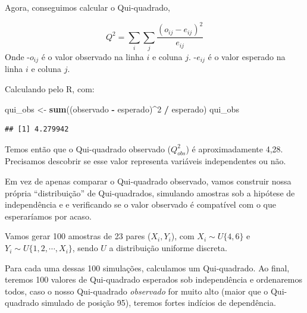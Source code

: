 \documentclass[
]{book}
\newenvironment{Shaded}{\begin{snugshade}}{\end{snugshade}}
\newcommand{\DecValTok}[1]{\textcolor[rgb]{0.00,0.00,0.81}{#1}}
\newcommand{\FunctionTok}[1]{\textcolor[rgb]{0.13,0.29,0.53}{\textbf{#1}}}
\newcommand{\NormalTok}[1]{#1}
\newcommand{\OtherTok}[1]{\textcolor[rgb]{0.56,0.35,0.01}{#1}}
\newcommand{\SpecialCharTok}[1]{\textcolor[rgb]{0.81,0.36,0.00}{\textbf{#1}}}
\begin{document}
Agora, conseguimos calcular o Qui-quadrado,

\[
Q^2 = \sum_i \sum_j \frac{(o_{ij}-e_{ij})^2}{e_{ij}}
\]
Onde
-\(o_{ij}\) é o valor observado na linha \(i\) e coluna \(j\).
-\(e_{ij}\) é o valor esperado na linha \(i\) e coluna \(j\).

Calculando pelo R, com:

\begin{Shaded}
\begin{Highlighting}[]
\NormalTok{qui\_obs }\OtherTok{\textless{}{-}} \FunctionTok{sum}\NormalTok{((observado }\SpecialCharTok{{-}}\NormalTok{ esperado)}\SpecialCharTok{\^{}}\DecValTok{2} \SpecialCharTok{/}\NormalTok{ esperado)}
\NormalTok{qui\_obs}
\end{Highlighting}
\end{Shaded}

\begin{verbatim}
## [1] 4.279942
\end{verbatim}

Temos então que o Qui-quadrado observado (\(Q_{obs}^2\)) é aproximadamente 4,28. Precisamos descobrir se esse valor representa variáveis independentes ou não.

Em vez de apenas comparar o Qui-quadrado observado, vamos construir nossa própria ``distribuição'' de Qui-quadrados, simulando amostras sob a hipótese de independência e e verificando se o valor observado é compatível com o que esperaríamos por acaso.

Vamos gerar 100 amostras de 23 pares (\(X_i, Y_i\)), com \(X_i \sim U\{4, 6\}\) e \(Y_i \sim U\{1, 2, \cdots, X_i\}\), sendo \(U\) a distribuição uniforme discreta.

Para cada uma dessas 100 simulações, calculamos um Qui-quadrado. Ao final, teremos 100 valores de Qui-quadrado esperados sob independência e ordenaremos todos, caso o nosso Qui-quadrado \emph{observado} for muito alto (maior que o Qui-quadrado simulado de posição 95), teremos fortes indícios de dependência.
\end{document}
